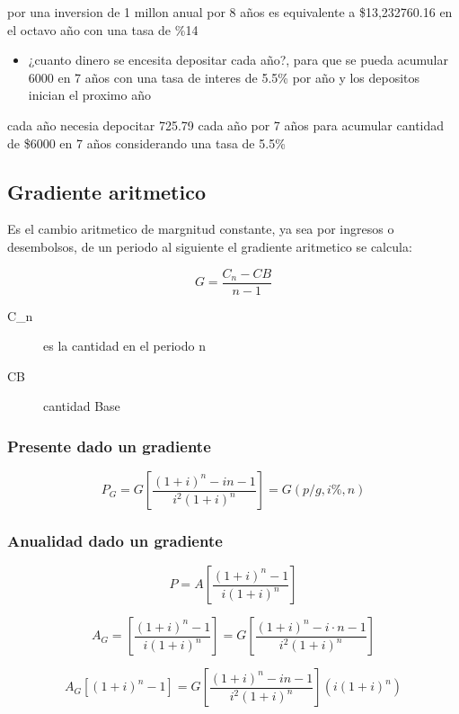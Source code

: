 \documentclass[11pt]{article}
\begin{document}
\begin{mdframed}
por una inversion de 1 millon anual por 8 años es equivalente a \$13,232760.16 en el octavo año con una tasa de \%14
\end{mdframed}

\begin{itemize}
\item ¿cuanto dinero se encesita depositar cada año?, para que se pueda acumular 6000 en 7 años con una tasa de interes de 5.5\% por año y los depositos inician el proximo año
\end{itemize}

\begin{mdframed}
cada año necesia depocitar 725.79 cada año por 7 años para acumular cantidad de \$6000 en 7 años considerando una tasa de 5.5\%
\end{mdframed}

\subsection*{Gradiente aritmetico}
\label{sec:org4547f1a}
Es el cambio aritmetico de margnitud constante, ya sea por ingresos o desembolsos, de un periodo al siguiente el gradiente aritmetico se calcula:

\[
G = \frac{C_n - CB}{n-1}
\]

\begin{description}
\item[{C\_n}] es la cantidad en el periodo n
\item[{CB}] cantidad Base
\end{description}

\subsubsection*{Presente dado un gradiente}
\label{sec:org0c48ec0}

\[
P_G = G\left[ \frac{ (1+i)^n - in-1 }{ i^2 (1+i)^n } \right] = G(p/g, i\%, n)
\]

\subsubsection*{Anualidad dado un gradiente}
\label{sec:orgb597956}
\[
P =A\left[ \frac{(1+i)^n - 1}{i(1+i)^n} \right]
\]

\[
A_G = \left[ \frac{(1+i)^n-1}{i(1+i)^n} \right]= G \left[ \frac{(1+i)^n-i\cdot n-1}{i^2 (1+i)^n} \right]
\]

\[
A_G\left[ (1+i)^n-1 \right] = G\left[ \frac{(1+i)^n - in-1}{i^2(1+i)^n} \right] (i(1+i)^n)
\]
\end{document}
